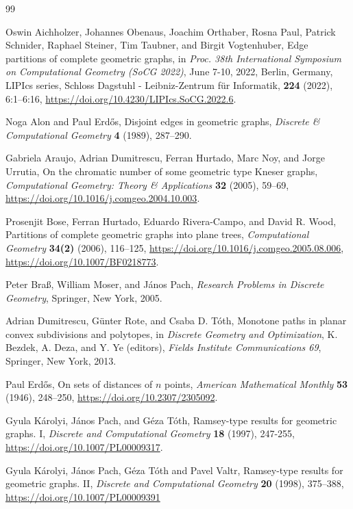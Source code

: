 \documentclass[a4paper,USenglish]{lipics-v2021}
\begin{document}
\begin{thebibliography}{99}

Oswin Aichholzer, Johannes Obenaus, Joachim Orthaber, Rosna Paul, Patrick Schnider,
Raphael Steiner, Tim Taubner, and Birgit Vogtenhuber,
Edge partitions of complete geometric graphs,
in \emph{Proc. 38th International Symposium on Computational Geometry (SoCG 2022)},
June 7-10, 2022, Berlin, Germany, LIPIcs series,
Schloss Dagstuhl - Leibniz-Zentrum f{\"{u}}r Informatik,
\textbf{224} (2022), 6:1--6:16, \url{https://doi.org/10.4230/LIPIcs.SoCG.2022.6}.

 Noga Alon and Paul Erd{\H o}s,
 Disjoint edges in geometric graphs,
 \emph{Discrete \& Computational Geometry}
\textbf{4} (1989), 287--290.

Gabriela Araujo, Adrian Dumitrescu, Ferran Hurtado, Marc Noy, and Jorge Urrutia,
On the chromatic number of some geometric type Kneser graphs,
\emph{Computational Geometry: Theory \& Applications} {\bf 32} (2005), 59--69,
\url{https://doi.org/10.1016/j.comgeo.2004.10.003}.

  Prosenjit Bose, Ferran Hurtado, Eduardo  Rivera-Campo, and David R. Wood,
Partitions of complete geometric graphs into plane trees,
\emph{Computational Geometry}
\textbf{34(2)} (2006), 116--125,
\url{https://doi.org/10.1016/j.comgeo.2005.08.006},
\url{https://doi.org/10.1007/BF0218773}.

Peter Bra\ss , William Moser, and J\'anos Pach,
\emph{Research Problems in Discrete Geometry},
Springer, New York, 2005.

Adrian Dumitrescu, G\"{u}nter Rote, and Csaba D. T\'oth,
Monotone paths in planar convex subdivisions and polytopes,
in {\em Discrete Geometry and Optimization}, 
K. Bezdek, A. Deza, and Y. Ye (editors), 
\emph{Fields Institute Communications 69}, 
Springer, New York, 2013.   

 Paul Erd\H{o}s,
On sets of distances of $n$ points,
\emph{American Mathematical Monthly}
\textbf{53} (1946), 248--250,
\url{https://doi.org/10.2307/2305092}.

 Gyula K\'arolyi, J{\'a}nos Pach, and G{\'{e}}za T\'oth,
{Ramsey-type results for geometric graphs. I},
\emph{Discrete and Computational Geometry}
     \textbf{18} (1997), 247-255,
     \url{https://doi.org/10.1007/PL00009317}.

 Gyula K\'arolyi, J{\'a}nos Pach,  G{\'{e}}za T\'oth and Pavel Valtr,
{Ramsey-type results for geometric graphs. II},
\emph{Discrete and Computational Geometry}
     \textbf{20} (1998), 375--388,
     \url{ https://doi.org/10.1007/PL00009391}


\end{thebibliography}
\end{document}
